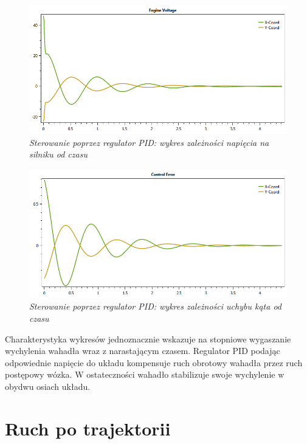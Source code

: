 \documentclass[12pt, twoside, openany]{report}
\theoremstyle{definition}
\begin{document}
\begin{figure}[H]
	\centering
		\includegraphics[width = 350pt]{PIDEV} 
		\caption{\textit{Sterowanie poprzez regulator PID: wykres zależności napięcia na silniku od czasu}}
		\label{plot:PIDEV}
\end{figure}

\begin{figure}[H]
	\centering
		\includegraphics[width = 350pt]{PIDCE} 
		\caption{\textit{Sterowanie poprzez regulator PID: wykres zależności uchybu kąta od czasu}}
		\label{plot:PIDCE}
\end{figure}

Charakterystyka wykresów jednoznacznie wskazuje na stopniowe wygaszanie wychylenia wahadła wraz z narastającym czasem. Regulator PID podając odpowiednie napięcie do układu kompensuje ruch obrotowy wahadła przez ruch postępowy wózka. W ostateczności wahadło stabilizuje swoje wychylenie w obydwu osiach układu.

\section{Ruch po trajektorii}
\end{document}
